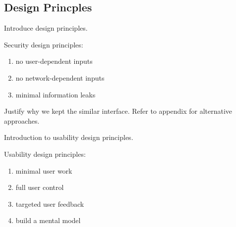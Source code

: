\documentclass[USenglish,oneside,twocolumn]{article}
\begin{document}
\subsection{Design Princples} 
{\color {blue}
Introduce design principles. 

Security design principles: 
\begin{enumerate}
\item no user-dependent inputs 
\item no network-dependent inputs
\item minimal information leaks
\end{enumerate} 

Justify why we kept the similar interface. Refer to appendix for alternative approaches. 

Introduction to usability design principles. 

Usability design principles: 
\begin{enumerate}
\item minimal user work
\item full user control  
\item targeted user feedback
\item build a mental model
\end{enumerate} 
}
\end{document}
